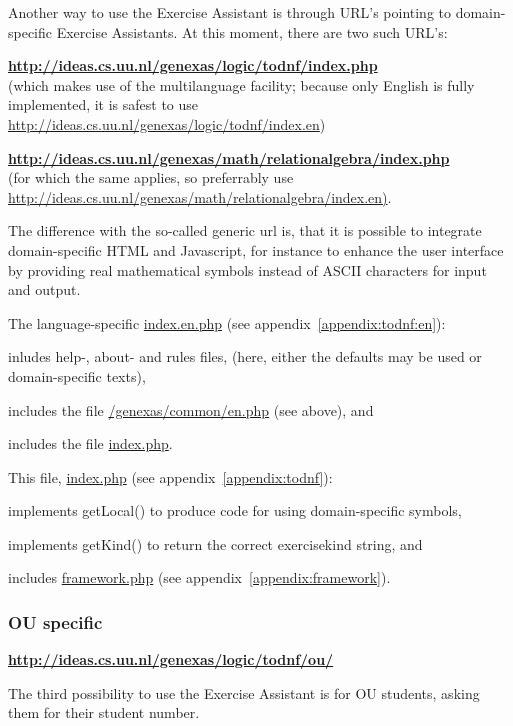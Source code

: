 \documentclass{article}
\begin{document}
Another way to use the Exercise Assistant is through URL's pointing to domain-specific Exercise Assistants. At this moment, there are two such URL's: 

\textbf{\url{http://ideas.cs.uu.nl/genexas/logic/todnf/index.php}} \\ (which makes use of the multilanguage facility; because only English is fully implemented, it is safest to use \url{http://ideas.cs.uu.nl/genexas/logic/todnf/index.en}) 

\textbf{\url{http://ideas.cs.uu.nl/genexas/math/relationalgebra/index.php}} \\ (for which the same applies, so preferrably use \url{http://ideas.cs.uu.nl/genexas/math/relationalgebra/index.en)}.

The difference with the so-called generic url is, that it is possible to integrate domain-specific HTML and Javascript, for instance to enhance the user interface by providing real mathematical symbols instead of ASCII characters for input and output.

The language-specific \url{index.en.php} (see appendix~\ref{appendix:todnf:en}):
\begin{compactitem}
\item inludes  help-, about- and rules files, (here, either the defaults may be used or domain-specific texts),
\item includes the file \url{/genexas/common/en.php} (see above), and 
\item includes the file \url{index.php}.
\end{compactitem}

This file, \url{index.php} (see appendix~\ref{appendix:todnf}):
\begin{compactitem}
\item implements getLocal() to produce code for using domain-specific symbols, 
\item implements getKind() to return the correct exercisekind string, and
\item includes \url{framework.php} (see appendix~\ref{appendix:framework}).
\end{compactitem}

\subsubsection{OU specific}
\textbf{\url{http://ideas.cs.uu.nl/genexas/logic/todnf/ou/}}

The third possibility to use the Exercise Assistant is for OU students, asking them for their student number.
\end{document}
